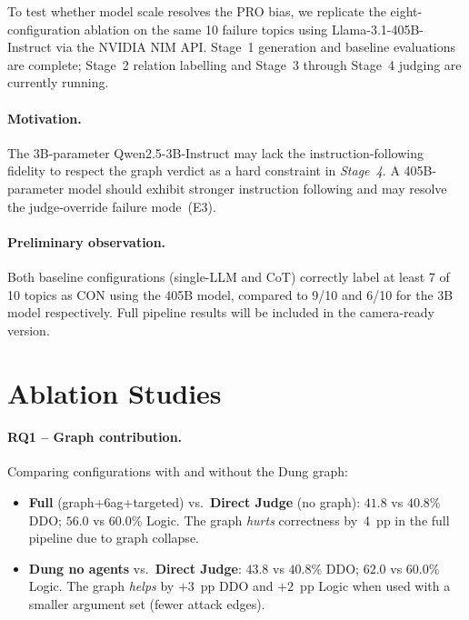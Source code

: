 \documentclass[11pt,twocolumn,letterpaper]{article}
\newcommand{\stage}[1]{\textit{Stage~#1}}
\newcommand{\SmallModel}{Qwen2.5-3B-Instruct}
\newcommand{\LargeModel}{Llama-3.1-405B-Instruct}
\begin{document}
To test whether model scale resolves the PRO bias, we replicate the
eight-configuration ablation on the same 10 failure topics using
\LargeModel{} via the NVIDIA NIM API.
Stage~1 generation and baseline evaluations are complete; Stage~2 relation
labelling and Stage~3 through Stage~4 judging are currently running.

\paragraph{Motivation.}
The 3B-parameter \SmallModel{} may lack the instruction-following fidelity
to respect the graph verdict as a hard constraint in \stage{4}.
A 405B-parameter model should exhibit stronger instruction following
and may resolve the judge-override failure mode~(E3).

\paragraph{Preliminary observation.}
Both baseline configurations (single-LLM and CoT) correctly label at
least 7 of 10 topics as CON using the 405B model, compared to 9/10 and
6/10 for the 3B model respectively.
Full pipeline results will be included in the camera-ready version.

\section{Ablation Studies}
\label{sec:ablation}

\paragraph{RQ1 -- Graph contribution.}
Comparing configurations with and without the Dung graph:

\begin{itemize}
  \item \textbf{Full} (graph+6ag+targeted) vs.\ \textbf{Direct Judge}
    (no graph): $41.8$ vs $40.8$\% DDO; $56.0$ vs $60.0$\% Logic.
    The graph \emph{hurts} correctness by~4~pp in the full pipeline due
    to graph collapse.
  \item \textbf{Dung no agents} vs.\ \textbf{Direct Judge}:
    $43.8$ vs $40.8$\% DDO; $62.0$ vs $60.0$\% Logic.
    The graph \emph{helps} by $+3$~pp DDO and $+2$~pp Logic when used with
    a smaller argument set (fewer attack edges).
\end{itemize}
\end{document}
